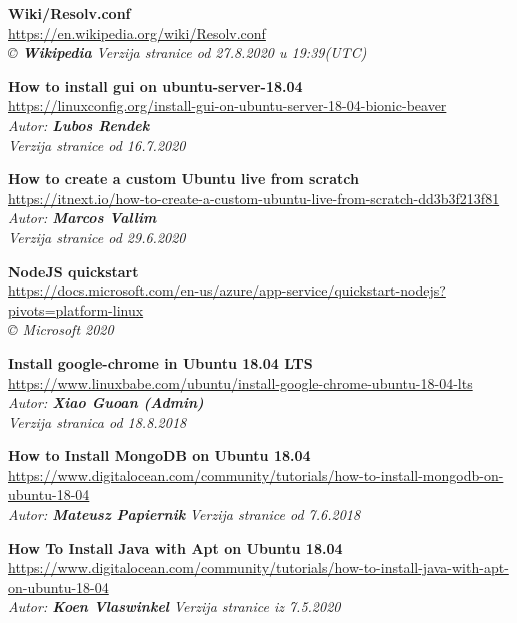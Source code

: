 \documentclass[12pt,vi]{mitthesis}
\begin{document}
\begin{thebibliography}{38}
\textbf{Wiki/Resolv.conf}\\
\url{https://en.wikipedia.org/wiki/Resolv.conf}\\
\textit{© \textbf{Wikipedia}}
\textit{Verzija stranice od 27.8.2020 u 19:39(UTC)}

\textbf{How to install gui on ubuntu-server-18.04}\\
\url{https://linuxconfig.org/install-gui-on-ubuntu-server-18-04-bionic-beaver}\\
\textit{Autor: \textbf{Lubos Rendek}}\\
\textit{Verzija stranice od 16.7.2020}

\textbf{How to create a custom Ubuntu live from scratch}\\
\url{https://itnext.io/how-to-create-a-custom-ubuntu-live-from-scratch-dd3b3f213f81}\\
\textit{Autor: \textbf{Marcos Vallim}}\\
\textit{Verzija stranice od 29.6.2020}

\textbf{NodeJS quickstart}\\
\url{https://docs.microsoft.com/en-us/azure/app-service/quickstart-nodejs?pivots=platform-linux}\\
\textit{© Microsoft 2020}

\textbf{Install google-chrome in Ubuntu 18.04 LTS}\\
\url{https://www.linuxbabe.com/ubuntu/install-google-chrome-ubuntu-18-04-lts}\\
\textit{Autor: \textbf{Xiao Guoan (Admin)}}\\
\textit{Verzija stranica od 18.8.2018}

\textbf{How to Install MongoDB on Ubuntu 18.04}\\
\url{https://www.digitalocean.com/community/tutorials/how-to-install-mongodb-on-ubuntu-18-04}\\
\textit{Autor: \textbf{Mateusz Papiernik}}
\textit{Verzija stranice od 7.6.2018}

\textbf{How To Install Java with Apt on Ubuntu 18.04}\\
\url{https://www.digitalocean.com/community/tutorials/how-to-install-java-with-apt-on-ubuntu-18-04}\\
\textit{Autor: \textbf{Koen Vlaswinkel}}
\textit{Verzija stranice iz 7.5.2020}


\end{thebibliography}
\end{document}
